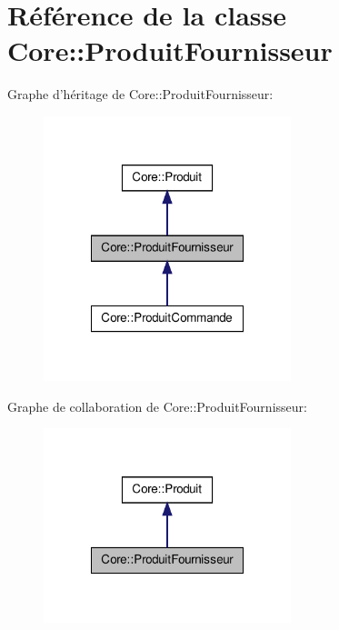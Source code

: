 \hypertarget{class_core_1_1_produit_fournisseur}{
\section{Référence de la classe Core::ProduitFournisseur}
\label{d6/db3/class_core_1_1_produit_fournisseur}
}


Graphe d'héritage de Core::ProduitFournisseur:\nopagebreak
\begin{figure}[H]
\begin{center}
\leavevmode
\includegraphics[width=204pt]{d9/d9d/class_core_1_1_produit_fournisseur__inherit__graph}
\end{center}
\end{figure}


Graphe de collaboration de Core::ProduitFournisseur:\nopagebreak
\begin{figure}[H]
\begin{center}
\leavevmode
\includegraphics[width=204pt]{d4/d4a/class_core_1_1_produit_fournisseur__coll__graph}
\end{center}
\end{figure}
